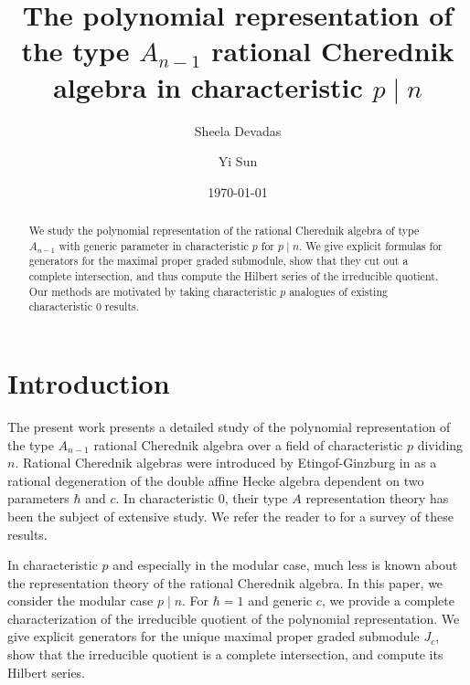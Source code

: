 \documentclass{amsart}
\numberwithin{equation}{section}
\theoremstyle{definition}
\begin{document}
\title[Polynomial representation of type $A_{n - 1}$ rational Cherednik algebra in characteristic $p \mid n$]{The polynomial representation of the type $A_{n - 1}$ rational Cherednik algebra in characteristic $p \mid n$}
\author{Sheela Devadas}
\author{Yi Sun}
\date{\today}

\begin{abstract}
We study the polynomial representation of the rational Cherednik algebra of type $A_{n-1}$ with generic parameter in characteristic $p$ for $p \mid n$. We give explicit formulas for generators for the maximal proper graded submodule, show that they cut out a complete intersection, and thus compute the Hilbert series of the irreducible quotient. Our methods are motivated by taking characteristic $p$ analogues of existing characteristic $0$ results.
\end{abstract}

\maketitle
\setcounter{tocdepth}{1}
\tableofcontents

\section{Introduction}

The present work presents a detailed study of the polynomial representation of the type $A_{n - 1}$ rational Cherednik algebra over a field of characteristic $p$ dividing $n$.  Rational Cherednik algebras were introduced by Etingof-Ginzburg in \cite{EG} as a rational degeneration of the double affine Hecke algebra dependent on two parameters $\hbar$ and $c$.  In characteristic $0$, their type $A$ representation theory has been the subject of extensive study.  We refer the reader to \cite{EM} for a survey of these results. 

In characteristic $p$ and especially in the modular case, much less is known about the representation theory of the rational Cherednik algebra.  In this paper, we consider the modular case $p \mid n$.  For $\hbar = 1$ and generic $c$, we provide a complete characterization of the irreducible quotient of the polynomial representation.  We give explicit generators for the unique maximal proper graded submodule $J_c$, show that the irreducible quotient is a complete intersection, and compute its Hilbert series.
\end{document}

